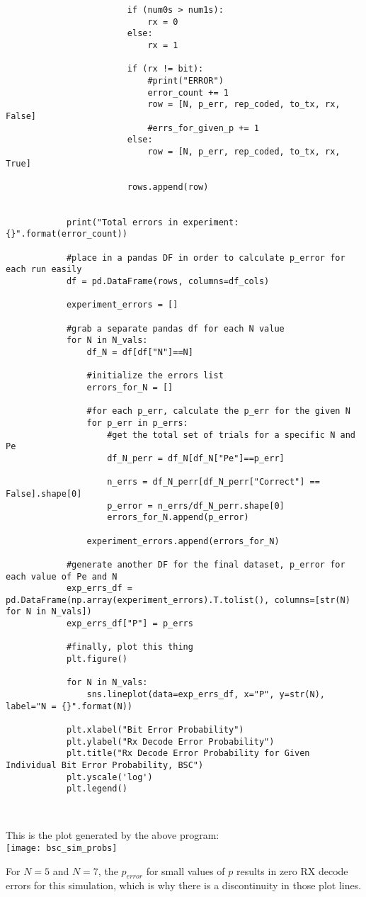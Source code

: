 \documentclass[]{article}
\begin{document}
\begin{enumerate}
\begin{enumerate}
\begin{lstlisting}
						if (num0s > num1s):
							rx = 0
						else:
							rx = 1
				
						if (rx != bit):
							#print("ERROR")
							error_count += 1
							row = [N, p_err, rep_coded, to_tx, rx, False]
							#errs_for_given_p += 1
						else:
							row = [N, p_err, rep_coded, to_tx, rx, True]
				
						rows.append(row)
			
			
			print("Total errors in experiment: {}".format(error_count))
			
			#place in a pandas DF in order to calculate p_error for each run easily
			df = pd.DataFrame(rows, columns=df_cols)
			
			experiment_errors = []
			
			#grab a separate pandas df for each N value
			for N in N_vals:
				df_N = df[df["N"]==N]
				
				#initialize the errors list
				errors_for_N = []
				
				#for each p_err, calculate the p_err for the given N
				for p_err in p_errs:
					#get the total set of trials for a specific N and Pe
					df_N_perr = df_N[df_N["Pe"]==p_err]
			
					n_errs = df_N_perr[df_N_perr["Correct"] == False].shape[0]
					p_error = n_errs/df_N_perr.shape[0]
					errors_for_N.append(p_error)
			
				experiment_errors.append(errors_for_N)
			
			#generate another DF for the final dataset, p_error for each value of Pe and N
			exp_errs_df = pd.DataFrame(np.array(experiment_errors).T.tolist(), columns=[str(N) for N in N_vals])
			exp_errs_df["P"] = p_errs
			
			#finally, plot this thing
			plt.figure()
			
			for N in N_vals:
				sns.lineplot(data=exp_errs_df, x="P", y=str(N), label="N = {}".format(N))
			
			plt.xlabel("Bit Error Probability")
			plt.ylabel("Rx Decode Error Probability")
			plt.title("Rx Decode Error Probability for Given Individual Bit Error Probability, BSC")
			plt.yscale('log')
			plt.legend()
			
			
		\end{lstlisting}
	
		This is the plot generated by the above program:\\
		\texttt{[image: bsc\_sim\_probs]}
		
		For $N=5$ and $N=7$, the $p_{error}$ for small values of $p$ results in zero RX decode errors for this simulation, which is why there is a discontinuity in those plot lines.
		

\end{enumerate}
\end{enumerate}
\end{document}

